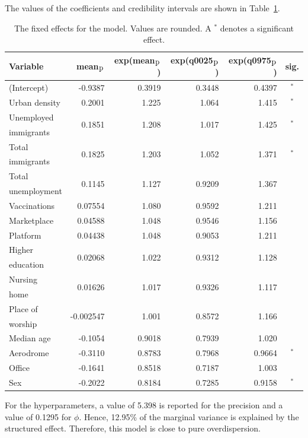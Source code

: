 The values of the coefficients and credibility intervals are shown in Table~\ref{fixedAllNorway_spatial}.
\begin{table}[H]
\caption{The fixed effects for the model. Values are rounded. A $^*$ denotes a significant effect. \label{fixedAllNorway_spatial}}
\begin{tabular}{l r r r r c}
\toprule
\textbf{Variable}	& \textbf{mean$_{\hbox{p}}$}	& \textbf{exp(mean$_{\hbox{p}}$)} & \textbf{exp(q0025$_{\hbox{p}}$)} & \textbf{exp(q0975$_{\hbox{p}}$)} & \textbf{sig.}\\
\midrule
(Intercept) & -0.9387 & 0.3919 & 0.3448 & 0.4397 & $^*$ \\
Urban density & 0.2001 & 1.225 & 1.064 & 1.415 & $^*$ \\
Unemployed & \multirow{2}{*}{0.1851} & \multirow{2}{*}{1.208} & \multirow{2}{*}{1.017} & \multirow{2}{*}{1.425} & \multirow{2}{*}{$^*$} \\
immigrants\\
Total & \multirow{2}{*}{0.1825}& \multirow{2}{*}{1.203}& \multirow{2}{*}{1.052}& \multirow{2}{*}{1.371}& \multirow{2}{*}{$^*$}\\
immigrants \\
Total & \multirow{2}{*}{0.1145}& \multirow{2}{*}{1.127}& \multirow{2}{*}{0.9209}& \multirow{2}{*}{1.367}\\
unemployment \\
Vaccinations & 0.07554 & 1.080 & 0.9592 & 1.211\\
Marketplace & 0.04588 & 1.048 & 0.9546 & 1.156 \\
Platform & 0.04438 & 1.048 & 0.9053 & 1.211\\
Higher & \multirow{2}{*}{0.02068}& \multirow{2}{*}{1.022}& \multirow{2}{*}{0.9312}& \multirow{2}{*}{1.128}\\ 
education \\
Nursing & \multirow{2}{*}{0.01626} & \multirow{2}{*}{1.017} & \multirow{2}{*}{0.9326} & \multirow{2}{*}{1.117} \\
home\\
Place of & \multirow{2}{*}{-0.002547}& \multirow{2}{*}{1.001}& \multirow{2}{*}{0.8572}& \multirow{2}{*}{1.166} \\
worship \\
Median age& -0.1054 & 0.9018 & 0.7939 & 1.020 \\
Aerodrome & -0.3110 & 0.8783 & 0.7968 & 0.9664 & $^*$ \\
Office & -0.1641 & 0.8518 & 0.7187 & 1.003 \\
Sex & -0.2022 & 0.8184 & 0.7285 & 0.9158 & $^*$ \\
\bottomrule
\end{tabular}
\end{table}
For the hyperparameters, a value of 5.398 is reported for the precision and a value of 0.1295 for $\phi$. Hence, 12.95\% of the marginal variance is explained by the structured effect. Therefore, this model is close to pure overdispersion.
\clearpage
